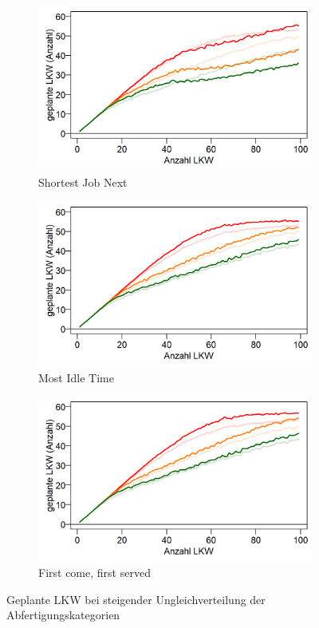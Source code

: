\begin{figure}[H]
\centering
\begin{subfigure}{.495\textwidth}
  \centering
  \includegraphics[width=\linewidth]{images/graphs/rsCategoryDistributionSjn.png}
  \caption{Shortest Job Next}
  \label{fig:ecd1}
\end{subfigure}
\begin{subfigure}{.495\textwidth}
  \centering
  \includegraphics[width=\linewidth]{images/graphs/rsCategoryDistributionMit.png}
  \caption{Most Idle Time}
  \label{fig:ecd2}
\end{subfigure}

\begin{subfigure}{.5\textwidth}
  \centering
  \includegraphics[width=\linewidth]{images/graphs/rsCategoryDistributionFcfs.png}
  \caption{First come, first served}
  \label{fig:ecd3}
\end{subfigure}
\caption{Geplante LKW bei steigender Ungleichverteilung der Abfertigungskategorien}
\label{fig:evalCategoryDist}
\end{figure}
